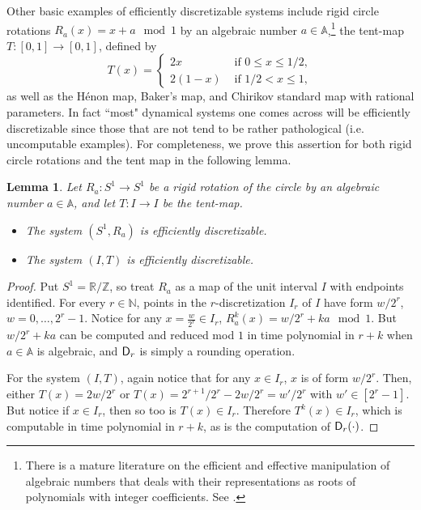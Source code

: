 \documentclass{amsart}
\theoremstyle{theorem}
\newtheorem{lemma}[theorem]{Lemma}
\theoremstyle{remark}
\numberwithin{equation}{section}
\renewcommand{\AA}{\mathbb{A}}
\newcommand{\NN}{\mathbb{N}}
\newcommand{\RR}{\mathbb{R}}
\newcommand{\ZZ}{\mathbb{Z}}
\newcommand{\ccD}{\textsf{\upshape D}}
\begin{document}
Other basic examples of efficiently discretizable systems include rigid circle rotations $R_a(x) = x+a \mod 1$ by an algebraic number $a \in \AA$,\footnote{There is a mature literature on the efficient and effective manipulation of algebraic numbers that deals with their representations as roots of polynomials with integer coefficients. See \cite{basu2006algorithms}.} the tent-map $T:[0,1]\rightarrow[0,1]$, defined by
\[
T(x) = \begin{cases}
2x &\text{ if } 0\leq x\leq 1/2,\\
2(1-x) &\text{ if } 1/2<x\leq 1,
\end{cases}
\]
as well as the H\'enon map, Baker's map, and Chirikov standard map with rational parameters. In fact ``most" dynamical systems one comes across will be efficiently discretizable since those that are not tend to be rather pathological (i.e. uncomputable examples). For completeness, we prove this assertion for both rigid circle rotations and the tent map in the following lemma.

\begin{lemma}\label{lemEfficientDiscretization} Let $R_a:S^1\rightarrow S^1$ be a rigid rotation of the circle by an algebraic number $a \in \mathbb{A}$, and let $T:I\rightarrow I$ be the tent-map.
\begin{itemize} 
\item The system $(S^1, R_a)$ is efficiently discretizable.
\item The system $(I, T)$ is efficiently discretizable.
\end{itemize}
\end{lemma}
\begin{proof}
Put $S^1 = \RR/\ZZ$, so treat $R_a$ as a map of the unit interval $I$ with endpoints identified. For every $r \in \NN$, points in the $r$-discretization $I_r$ of $I$ have form $w/2^r$, $w = 0,\dots,2^{r}-1$. Notice for any $x=\frac{w}{2^r} \in I_r$, $R_a^k(x) = w/2^r + ka \mod 1$. But $w/2^r + ka$ can be computed and reduced mod $1$ in time polynomial in $r +k$ when $a \in \AA$ is algebraic, and $\ccD_r$ is simply a rounding operation.

For the system $(I, T)$, again notice that for any $x \in I_r$, $x$ is of form $w/2^r$. Then, either $T(x) = 2w/2^r$ or $T(x) = 2^{r+1}/2^r - 2w/2^r = w'/2^r$ with $w' \in [2^r-1]$.
But notice if $x \in I_r$, then so too is $T(x) \in I_r$. Therefore $T^k(x) \in I_r$, which is computable in time polynomial in $r+k$, as is the computation of $\ccD_r(\cdot)$.
\end{proof}
\end{document}
